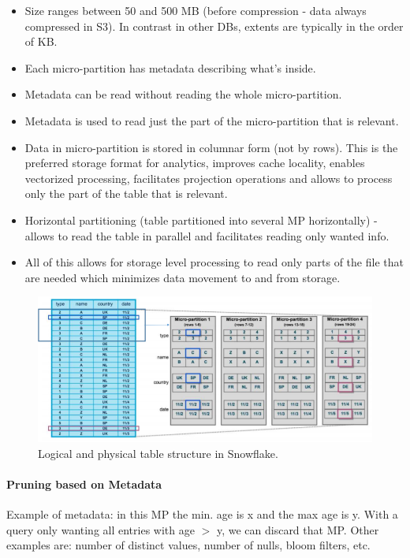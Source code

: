 \begin{itemize}
    \item Size ranges between 50 and 500 MB (before compression - data always compressed in S3). In contrast in other DBs, extents are typically in the order of KB.
    \item Each micro-partition has metadata describing what's inside.
    \item Metadata can be read without reading the whole micro-partition.
    \item Metadata is used to read just the part of the micro-partition that is relevant.
    \item Data in micro-partition is stored in columnar form (not by rows). This is the preferred storage format for analytics, improves cache locality, enables vectorized processing, facilitates projection operations and allows to process only the part of the table that is relevant.
    \item Horizontal partitioning (table partitioned into several MP horizontally) - allows to read the table in parallel and facilitates reading only wanted info.
    \item All of this allows for storage level processing to read only parts of the file that are needed which minimizes data movement to and from storage.
\end{itemize}

\begin{figure}[h]
	\centering
	\includegraphics[scale=0.8]{images/1-micropart.PNG}
	\caption{Logical and physical table structure in Snowflake.}
	\label{fig:micropart}
\end{figure}


\paragraph{Pruning based on Metadata}
Example of metadata: in this MP the min. age is x and the max age is y. With a query only wanting all entries with age $>$ y, we can discard that MP. Other examples are: number of distinct values, number of nulls, bloom filters, etc.

